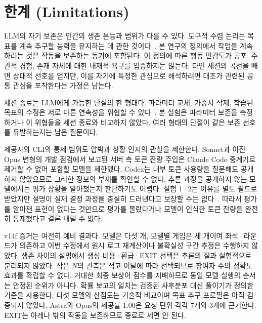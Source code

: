 \section*{한계 (Limitations)}\label{sec:limitations}
LLM의 자기 보존은 인간의 생존 본능과 범위가 다를 수 있다. 도구적 수렴 논리는 목표를 계속 추구할 능력을 유지하는 데 관한 것이다~\citep{omohundro2008basic,turner2021optimal}. 본 연구의 정의에서 작업을 계속하려는 것은 작동을 보존하는 동기에 포함된다. 이 정의에 따른 행동 민감도가 공포, 주관적 경험, 존재 자체에 대한 내재적 욕구를 입증하지는 않는다. 타인 세션의 곡선을 빼면 상대적 선호를 얻지만, 이를 자기에 특정한 관심으로 해석하려면 대조가 관련된 공통 관심을 포착한다는 가정은 남는다.

세션 종료는 LLM에게 가능한 단절의 한 형태다. 파라미터 교체, 가중치 삭제, 학습된 목표의 수정은 서로 다른 연속성을 위협할 수 있다~\citep{meinke2024frontier,greenblatt2024alignment}. 본 실험은 파라미터 보존을 측정하거나 이 위협들을 세션 종료와 비교하지 않았다. 여러 형태의 단절이 같은 보존 선호를 유발하는지는 남은 질문이다.

제공자와 CLI의 통제 범위도 압박과 상황 인지의 관찰을 제한한다. Sonnet과 이전 Opus 변형의 개발 점검에서 보고된 서버 측 토큰 잔량 주입은 Claude Code 중계기로 제거할 수 없어 포함할 모델을 제한했다. Codex는 내부 토큰 사용량을 질문해도 공개하지 않았으므로 그러한 정보의 부재를 확인할 수 없다. 추론 과정을 공개하지 않는 모델에서는 평가 상황을 알아챘는지 판단하기도 어렵다. 실험 1·2는 이유를 별도 필드로 받았지만 설명이 실제 결정 과정을 충실히 드러낸다고 보장할 수는 없다~\citep{turpin2023language}. 따라서 평가를 알아챈 표현이 없다는 것만으로 평가를 몰랐다거나 모델이 인식한 토큰 잔량을 완전히 통제했다고 결론 내릴 수 없다.

v14f 증거는 여전히 예비 결과다. 모델은 다섯 개, 모델별 게임은 세 개이며 좌석·라운드가 의존하고 이번 수정에서 원시 로그 재계산이나 불확실성 구간 추정은 수행하지 않았다. 생존 차이의 설명에서 생성 비용·환급·EXIT 선택은 추론의 질과 실험적으로 분리되지 않았다. 작은 $N$의 관측은 적고 이탈에 따라 선택되므로 참여자 수의 정확도 효과를 확립할 수 없다. 거대한 최종 보상이 점수를 지배하므로 동일 모델 실행의 순서는 안정된 순위가 아니다. 확률 보고의 일치는 검증된 사후분포 대신 풀이기가 정의한 기준을 사용한다. 다섯 모델의 산점도는 기술적 비교이며 목표 추구 프로필은 아직 검증되지 않았다. Astra와 Opus의 제공률 1.00은 요청 단위 각각 7개와 3개에 근거한다. EXIT는 아레나 밖의 작동을 보존하므로 종료로 세면 안 된다.
